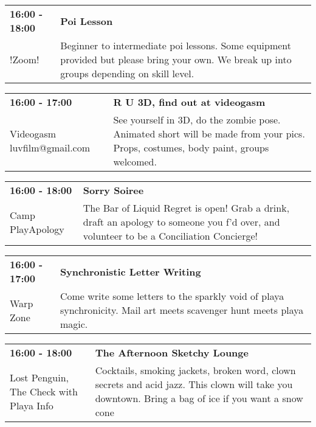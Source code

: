 \begin{tabular}{ p{1in} p{2.2in} }
    \textbf{16:00 - 18:00} & \textbf{Poi Lesson} \\
    !Zoom! \newline  & Beginner to intermediate poi lessons.  Some equipment provided but please bring your own.  We break up into groups depending on skill level. \\
    \hline 
\end{tabular}
    
\begin{tabular}{ p{1in} p{2.2in} }
    \textbf{16:00 - 17:00} & \textbf{R U 3D, find out at videogasm} \\
    Videogasm \newline luvfilm@gmail.com & See yourself in 3D, do the zombie pose. Animated short will be made from your pics. Props, costumes, body paint, groups  welcomed. \\
    \hline 
\end{tabular}
    
\begin{tabular}{ p{1in} p{2.2in} }
    \textbf{16:00 - 18:00} & \textbf{Sorry Soiree} \\
    Camp PlayApology \newline  & The Bar of Liquid Regret is open! Grab a drink, draft an apology to someone you f'd over, and volunteer to be a Conciliation Concierge! \\
    \hline 
\end{tabular}
    
\begin{tabular}{ p{1in} p{2.2in} }
    \textbf{16:00 - 17:00} & \textbf{Synchronistic Letter Writing} \\
    Warp Zone \newline  & Come write some letters to the sparkly void of playa synchronicity. Mail art meets scavenger hunt meets playa magic. \\
    \hline 
\end{tabular}
    
\begin{tabular}{ p{1in} p{2.2in} }
    \textbf{16:00 - 18:00} & \textbf{The Afternoon Sketchy Lounge} \\
    Lost Penguin, The \newline  Check with Playa Info & Cocktails, smoking jackets, broken word, clown secrets and acid jazz.  This clown will take you downtown.   Bring a bag of ice if you want a snow cone \\
    \hline 
\end{tabular}
    
